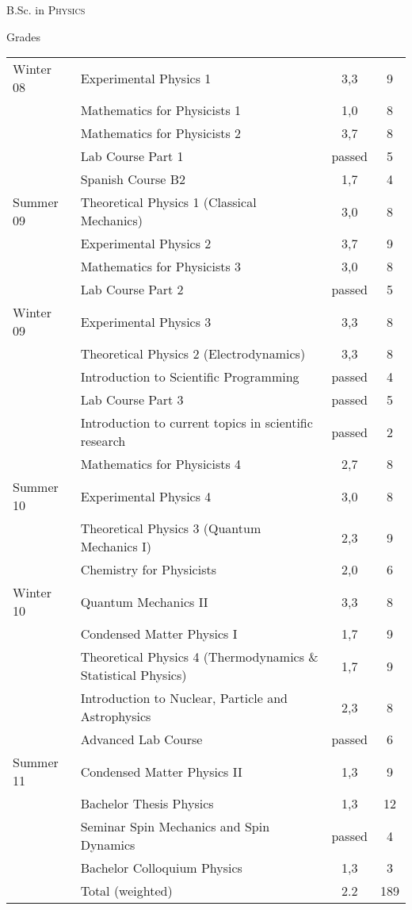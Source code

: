 \documentclass[a4paper,10pt]{article}
\begin{document}
\par{\centering\Large \hypertarget{physicsBSC}{B.Sc. in \textsc{Physics}}\par} \large{\centering Grades\par}\normalsize
\begin{center}
 \begin{supertabular}{p{2.5cm} p{7.3cm} c c}
Winter 08&Experimental Physics 1& 3,3 & 9\\
&Mathematics for Physicists 1& 1,0&8\\
& Mathematics for Physicists 2& 3,7& 8 \\
& Lab Course Part 1& passed & 5 \\ 
& Spanish Course B2 & 1,7 & 4 \\ \hline
Summer 09& Theoretical Physics 1 (Classical Mechanics)& 3,0& 8 \\
& Experimental Physics 2& 3,7& 9 \\
& Mathematics for Physicists 3& 3,0& 8 \\ 
& Lab Course Part 2& passed& 5 \\ \hline
Winter 09& Experimental Physics 3& 3,3& 8 \\ 
& Theoretical Physics 2 (Electrodynamics)& 3,3& 8 \\
& Introduction to Scientific Programming& passed& 4 \\
& Lab Course Part 3& passed & 5 \\
& Introduction to current topics in scientific research& passed & 2 \\
& Mathematics for Physicists 4& 2,7& 8 \\\hline
Summer 10& Experimental Physics 4& 3,0& 8 \\
& Theoretical Physics 3 (Quantum Mechanics I)& 2,3& 9 \\
& Chemistry for Physicists& 2,0& 6 \\\hline
Winter 10& Quantum Mechanics II & 3,3 & 8 \\
& Condensed Matter Physics I & 1,7 & 9 \\
& Theoretical Physics 4 (Thermodynamics \& Statistical Physics) & 1,7 & 9 \\
& Introduction to Nuclear, Particle and Astrophysics& 2,3 & 8 \\
& Advanced Lab Course& passed & 6 \\\hline
Summer 11& Condensed Matter Physics II& 1,3 & 9 \\ 
& Bachelor Thesis Physics& 1,3& 12 \\
& Seminar Spin Mechanics and Spin Dynamics & passed& 4\\
& Bachelor Colloquium Physics& 1,3 & 3 \\ \hline\hline
& Total (weighted) & 2.2 & 189 \\
 \end{supertabular}
\end{center}
\bigskip
\newpage
\end{document}
